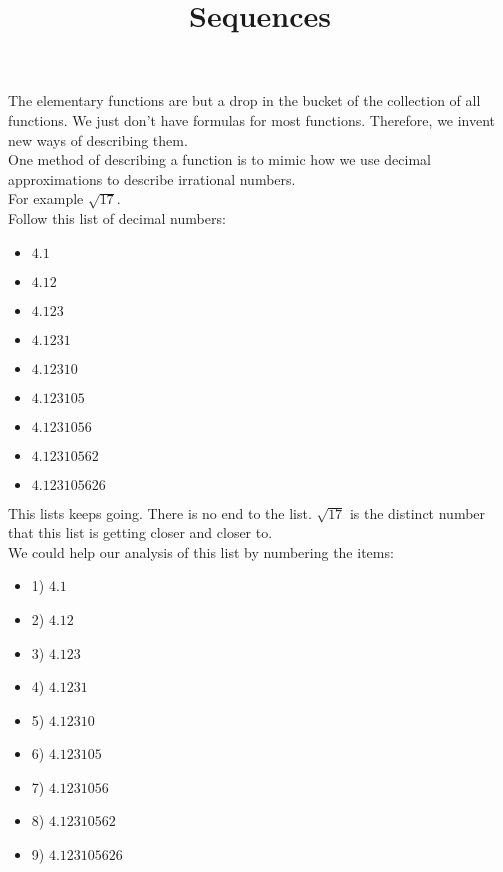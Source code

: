 \documentclass{ximera}
\title{Sequences}
\begin{document}
\begin{abstract}
\end{abstract}

\maketitle





The elementary functions are but a drop in the bucket of the collection of all functions.  We just don't have formulas for most functions.  Therefore, we invent new ways of describing them. \\


One method of describing a function is to mimic how we use decimal approximations to describe irrational numbers. \\


For example $\sqrt{17}$. \\

Follow this list of decimal numbers:


\begin{itemize}
\item $4.1$
\item $4.12$
\item $4.123$
\item $4.1231$
\item $4.12310$
\item $4.123105$
\item $4.1231056$
\item $4.12310562$
\item $4.123105626$
\end{itemize}


This lists keeps going.  There is no end to the list.  $\sqrt{17}$ is the distinct number that this list is getting closer and closer to. \\



We could help our analysis of this list by numbering the items:

\begin{itemize}
\item 1) $4.1$
\item 2) $4.12$
\item 3) $4.123$
\item 4) $4.1231$
\item 5) $4.12310$
\item 6) $4.123105$
\item 7) $4.1231056$
\item 8) $4.12310562$
\item 9) $4.123105626$
\end{itemize}
\end{document}
